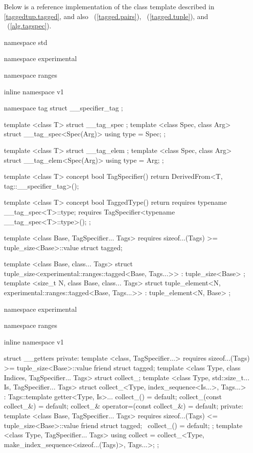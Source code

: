 
\pnum Below is a reference implementation of the  class template described in
\ref{taggedtup.tagged}, and also ~(\ref{tagged.pairs}),
~(\ref{tagged.tuple}), and ~(\ref{alg.tagspec}).

\begin{codeblock}
namespace std { namespace experimental { namespace ranges { inline namespace v1 {
  namespace tag { struct __specifier_tag { }; }

  template <class T>
  struct __tag_spec { };
  template <class Spec, class Arg>
  struct __tag_spec<Spec(Arg)> { using type = Spec; };

  template <class T>
  struct __tag_elem { };
  template <class Spec, class Arg>
  struct __tag_elem<Spec(Arg)> { using type = Arg; };

  template <class T>
  concept bool TagSpecifier() {
    return DerivedFrom<T, tag::__specifier_tag>();
  }

  template <class T>
  concept bool TaggedType() {
    return requires {
      typename __tag_spec<T>::type;
      requires TagSpecifier<typename __tag_spec<T>::type>();
    };
  }

  template <class Base, TagSpecifier... Tags>
    requires sizeof...(Tags) >= tuple_size<Base>::value
  struct tagged;
  }}}

  template <class Base, class... Tags>
  struct tuple_size<experimental::ranges::tagged<Base, Tags...>>
    : tuple_size<Base> { };
  template <size_t N, class Base, class... Tags>
  struct tuple_element<N, experimental::ranges::tagged<Base, Tags...>>
    : tuple_element<N, Base> { };

  namespace experimental { namespace ranges { inline namespace v1 {

  struct __getters {
  private:
    template <class, TagSpecifier...>
      requires sizeof...(Tags) >= tuple_size<Base>::value
    friend struct tagged;
    template <class Type, class Indices, TagSpecifier... Tags>
    struct collect_;
    template <class Type, std::size_t... Is, TagSpecifier... Tags>
    struct collect_<Type, index_sequence<Is...>, Tags...>
      : Tags::template getter<Type, Is>... {
      collect_() = default;
      collect_(const collect_&) = default;
      collect_& operator=(const collect_&) = default;
    private:
      template <class Base, TagSpecifier... Tags>
        requires sizeof...(Tags) <= tuple_size<Base>::value
      friend struct tagged;
      ~collect_() = default;
    };
    template <class Type, TagSpecifier... Tags>
    using collect = collect_<Type, make_index_sequence<sizeof...(Tags)>, Tags...>;
  };

}}}}
\end{codeblock}
